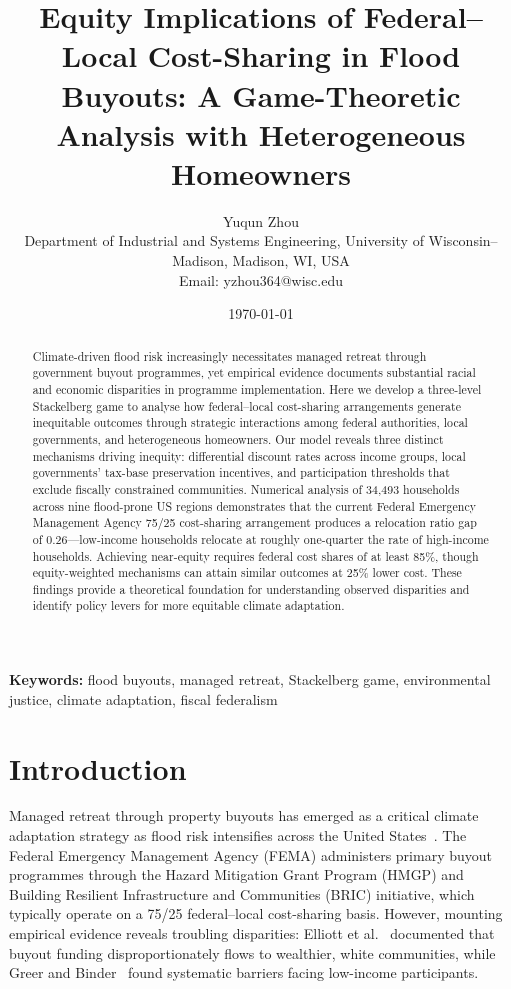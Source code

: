 \documentclass[11pt,letterpaper]{article}
\title{\Large\textbf{Equity Implications of Federal--Local Cost-Sharing in Flood Buyouts: A Game-Theoretic Analysis with Heterogeneous Homeowners}}
\author{
Yuqun Zhou\\[0.5em]
\small Department of Industrial and Systems Engineering, University of Wisconsin--Madison, Madison, WI, USA\\
\small Email: yzhou364@wisc.edu
}
\date{\today}
\theoremstyle{definition}
\begin{document}
\maketitle


\begin{abstract}
\noindent
Climate-driven flood risk increasingly necessitates managed retreat through government buyout programmes, yet empirical evidence documents substantial racial and economic disparities in programme implementation. Here we develop a three-level Stackelberg game to analyse how federal--local cost-sharing arrangements generate inequitable outcomes through strategic interactions among federal authorities, local governments, and heterogeneous homeowners. Our model reveals three distinct mechanisms driving inequity: differential discount rates across income groups, local governments' tax-base preservation incentives, and participation thresholds that exclude fiscally constrained communities. Numerical analysis of 34,493 households across nine flood-prone US regions demonstrates that the current Federal Emergency Management Agency 75/25 cost-sharing arrangement produces a relocation ratio gap of 0.26---low-income households relocate at roughly one-quarter the rate of high-income households. Achieving near-equity requires federal cost shares of at least 85\%, though equity-weighted mechanisms can attain similar outcomes at 25\% lower cost. These findings provide a theoretical foundation for understanding observed disparities and identify policy levers for more equitable climate adaptation.
\end{abstract}

\vspace{1em}
\noindent\textbf{Keywords:} flood buyouts, managed retreat, Stackelberg game, environmental justice, climate adaptation, fiscal federalism


\section{Introduction}

Managed retreat through property buyouts has emerged as a critical climate adaptation strategy as flood risk intensifies across the United States~\cite{siders2019strategic, mach2019managed}. The Federal Emergency Management Agency (FEMA) administers primary buyout programmes through the Hazard Mitigation Grant Program (HMGP) and Building Resilient Infrastructure and Communities (BRIC) initiative, which typically operate on a 75/25 federal--local cost-sharing basis. However, mounting empirical evidence reveals troubling disparities: Elliott et al.~\cite{elliott2021racial} documented that buyout funding disproportionately flows to wealthier, white communities, while Greer and Binder~\cite{greer2021political} found systematic barriers facing low-income participants.
\end{document}
